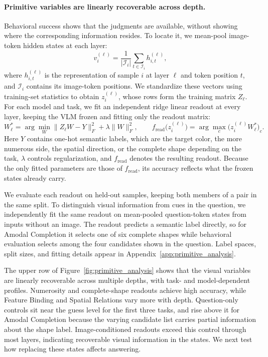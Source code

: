 \documentclass{article} %
\begin{document}
\paragraph{Primitive variables are linearly recoverable across depth.}
Behavioral success shows that the judgments are available, without showing where the corresponding information resides. To locate it, we mean-pool image-token hidden states at each layer:
\begin{equation}
    v_i^{(\ell)}=\frac{1}{|\mathcal I_i|}
    \sum_{t\in\mathcal I_i}h_{i,t}^{(\ell)},
\end{equation}
where $h_{i,t}^{(\ell)}$ is the representation of sample $i$ at layer $\ell$ and token position $t$, and $\mathcal I_i$ contains its image-token positions. We standardize these vectors using training-set statistics to obtain $z_i^{(\ell)}$, whose rows form the training matrix $Z_\ell$. For each model and task, we fit an independent ridge linear readout at every layer, keeping the VLM frozen and fitting only the readout matrix:
\begin{equation}
    W_\ell^*=\arg\min_W\|Z_\ell W-Y\|_F^2+\lambda\|W\|_F^2,
    \qquad
    f_{\mathrm{read}}\bigl(z_i^{(\ell)}\bigr)=\arg\max_c\bigl(z_i^{(\ell)}W_\ell^*\bigr)_c.
\end{equation}
Here $Y$ contains one-hot semantic labels, which are the target color, the more numerous side, the spatial direction, or the complete shape depending on the task, $\lambda$ controls regularization, and $f_{\mathrm{read}}$ denotes the resulting readout. Because the only fitted parameters are those of $f_{\mathrm{read}}$, its accuracy reflects what the frozen states already carry.

We evaluate each readout on held-out samples, keeping both members of a pair in the same split. To distinguish visual information from cues in the question, we independently fit the same readout on mean-pooled question-token states from inputs without an image. The readout predicts a semantic label directly, so for Amodal Completion it selects one of six complete shapes while behavioral evaluation selects among the four candidates shown in the question. Label spaces, split sizes, and fitting details appear in Appendix~\ref{app:primitive_analysis}.

The upper row of Figure~\ref{fig:primitive_analysis} shows that the visual variables are linearly recoverable across multiple depths, with task- and model-dependent profiles. Numerosity and complete-shape readouts achieve high accuracy, while Feature Binding and Spatial Relations vary more with depth. Question-only controls sit near the guess level for the first three tasks, and rise above it for Amodal Completion because the varying candidate list carries partial information about the shape label. Image-conditioned readouts exceed this control through most layers, indicating recoverable visual information in the states. We next test how replacing these states affects answering.
\end{document}
